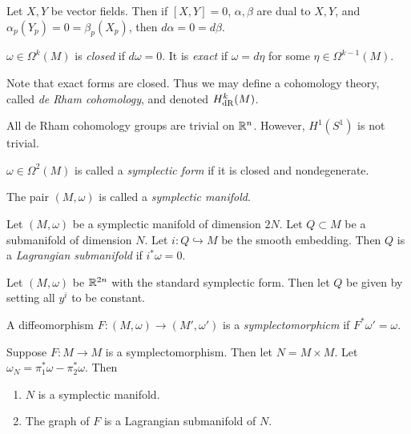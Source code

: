 \documentclass[twoside, 10pt]{article}
\begin{document}
    \begin{exm}
        Let $X,Y$ be vector fields. Then if $[X,Y] = 0$, $\alpha,\beta$ are dual to $X,Y$, and $\alpha_p(Y_p) = 0 = \beta_p(X_p)$, then $d\alpha = 0 = d\beta$.
    \end{exm}

    \begin{defn}
        $\omega \in \Omega^k(M)$ is \textit{closed} if $d\omega = 0$. It is \textit{exact} if $\omega = d\eta$ for some $\eta \in \Omega^{k-1}(M)$.
    \end{defn}

    Note that exact forms are closed. Thus we may define a cohomology theory, called \textit{de Rham cohomology}, and denoted $H^k_{\mathrm{dR}}(M)$.

    \begin{exm}
        All de Rham cohomology groups are trivial on $\mathbb{R}^n$. However, $H^1(S^1)$ is not trivial.
    \end{exm}

    \begin{defn}
        $\omega \in \Omega^2(M)$ is called a \textit{symplectic form} if it is closed and nondegenerate.
    \end{defn}
    
    The pair $(M,\omega)$ is called a \textit{symplectic manifold}.

    \begin{defn}
        Let $(M,\omega)$ be a symplectic manifold of dimension $2N$. Let $Q \subset M$ be a submanifold of dimension $N$. Let $i:Q \hookrightarrow M$ be the smooth embedding. Then $Q$ is a \textit{Lagrangian submanifold} if $i^*\omega = 0$.
    \end{defn}

    \begin{exm}
        Let $(M,\omega)$ be $\mathbb{R}^{2n}$ with the standard symplectic form. Then let $Q$ be given by setting all $y^i$ to be constant.
    \end{exm}

    \begin{defn}
        A diffeomorphism $F:(M,\omega) \to (M', \omega')$ is a \textit{symplectomorphicm} if $F^*\omega' = \omega$.
    \end{defn}

    \begin{exer}[Homework]
        Suppose $F:M \to M$ is a symplectomorphism. Then let $N = M \times M$. Let $\omega_N = \pi_1^* \omega - \pi_2^* \omega$. Then
        \begin{enumerate}
            \item $N$ is a symplectic manifold.
            \item The graph of $F$ is a Lagrangian submanifold of $N$.
        \end{enumerate}
    \end{exer}
\end{document}
